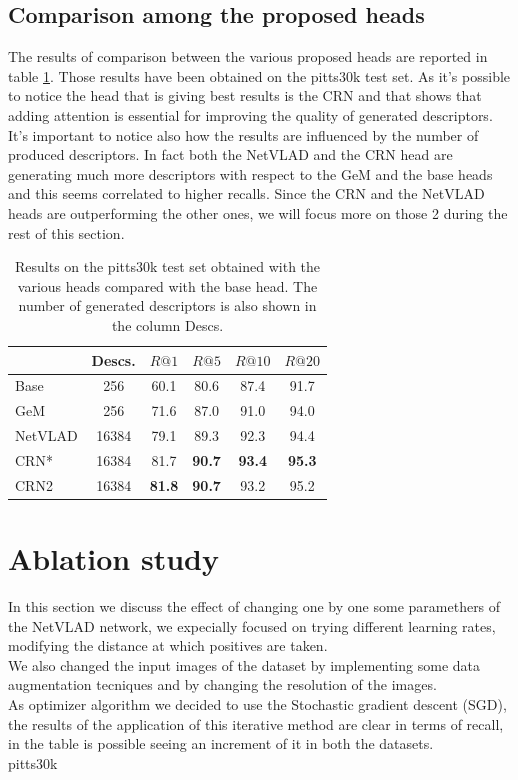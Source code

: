 \documentclass[10pt,twocolumn,letterpaper]{article}
\begin{document}
	\subsection{Comparison among the proposed heads}
	The results of comparison between the various proposed heads are reported in table \ref{tab:base_results}. Those results have 
	been obtained on the pitts30k test set. As it's possible to notice the head that is giving best results is the CRN and that 
	shows that adding attention is essential for improving the quality of generated descriptors. It's important to notice also how 
	the results are influenced by the number of produced descriptors. In fact both the NetVLAD and the CRN head are generating much 
	more descriptors with respect to the GeM and the base heads and this seems correlated to higher recalls. Since the CRN and the NetVLAD
	heads are outperforming the other ones, we will focus more on those 2 during the rest of this section.
	
	\begin{table}
		\centering
		\begin{tabular}{|l|c|c|c|c|c|}
			\hline
			& Descs.&        $R@1$   &        $R@5$   &        $R@10$  &        $R@20$   \\ \hline
			Base     & 256   &         60.1   &         80.6   &          87.4   &          91.7   \\
			GeM      & 256   &         71.6   &         87.0   &          91.0   &          94.0   \\
			NetVLAD  & 16384 &         79.1   &         89.3   &          92.3   &          94.4   \\ \hline
			CRN*     & 16384 &         81.7   & \textbf{90.7}  &  \textbf{93.4}  &  \textbf{95.3}  \\
			CRN2     & 16384 &\textbf{81.8}   & \textbf{90.7}  &          93.2   &          95.2   \\ \hline
		\end{tabular}
		\caption{Results on the pitts30k test set obtained with the various heads compared with the base head. The number of generated descriptors 
			is also shown in the column Descs.}
		\label{tab:base_results}
	\end{table}
	
	\section{Ablation study}
	In this section we discuss the effect of changing one by one some paramethers of the NetVLAD network, we expecially focused on trying different learning rates, modifying the distance at which positives are taken.\\ We also changed the input images of the dataset by implementing some data augmentation tecniques and by changing the resolution of the images.\\
	As optimizer algorithm we decided to use the Stochastic gradient descent (SGD), the results of the application of this iterative method are clear in terms of recall, in the table is possible seeing an increment of it in both the datasets.\\
	pitts30k
\end{document}
